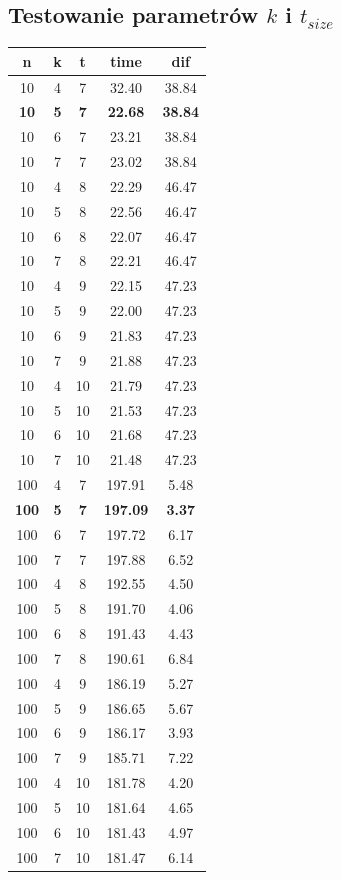 \documentclass[wide,a4paper,titlepage,12pt] {article}
\begin{document}
\subsection{Testowanie parametrów $k$ i $t_{size}$}
\begin{center}
    \begin{tabular}{|c|c|c|c|c|}
\hline
n & k & t & time & dif \\
\hline
10 & 4 & 7 & 32.40 & 38.84 \\
\bf{10} & \bf{5} & \bf{7} & \bf{22.68} & \bf{38.84} \\
10 & 6 & 7 & 23.21 & 38.84 \\
10 & 7 & 7 & 23.02 & 38.84 \\
10 & 4 & 8 & 22.29 & 46.47 \\
10 & 5 & 8 & 22.56 & 46.47 \\
10 & 6 & 8 & 22.07 & 46.47 \\
10 & 7 & 8 & 22.21 & 46.47 \\
10 & 4 & 9 & 22.15 & 47.23 \\
10 & 5 & 9 & 22.00 & 47.23 \\
10 & 6 & 9 & 21.83 & 47.23 \\
10 & 7 & 9 & 21.88 & 47.23 \\
10 & 4 & 10 & 21.79 & 47.23 \\
10 & 5 & 10 & 21.53 & 47.23 \\
10 & 6 & 10 & 21.68 & 47.23 \\
10 & 7 & 10 & 21.48 & 47.23 \\
\hline
100 & 4 & 7 & 197.91 &  5.48 \\
\bf{100} & \bf{5} & \bf{7} & \bf{197.09} &  \bf{3.37} \\
100 & 6 & 7 & 197.72 &  6.17 \\
100 & 7 & 7 & 197.88 &  6.52 \\
100 & 4 & 8 & 192.55 &  4.50 \\
100 & 5 & 8 & 191.70 &  4.06 \\
100 & 6 & 8 & 191.43 &  4.43 \\
100 & 7 & 8 & 190.61 &  6.84 \\
100 & 4 & 9 & 186.19 &  5.27 \\
100 & 5 & 9 & 186.65 &  5.67 \\
100 & 6 & 9 & 186.17 &  3.93 \\
100 & 7 & 9 & 185.71 &  7.22 \\
100 & 4 & 10 & 181.78 &  4.20 \\
100 & 5 & 10 & 181.64 &  4.65 \\
100 & 6 & 10 & 181.43 &  4.97 \\
100 & 7 & 10 & 181.47 &  6.14 \\
\hline
    \end{tabular}
\end{center}
\end{document}
